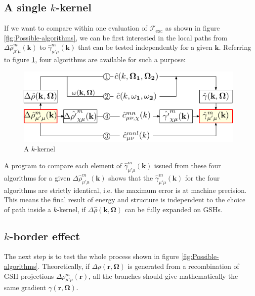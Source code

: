 \subsection{A single $k$-kernel\label{subsec:A-single-k-kernel}}

If we want to compare within one evaluation of $\mathcal{F}_{\mathrm{exc}}$
as shown in figure \ref{fig:Possible-algorithms}, we can be first
interested in the local paths from $\Delta\hat{\rho}_{\mu'\mu}^{m}(\mathbf{k})$
to $\hat{\gamma}_{\mu'\mu}^{m}(\mathbf{k})$ that can be tested independently
for a given $\mathbf{k}$. Referring to figure \ref{fig:k-kernel},
four algorithms are available for such a purpose:

\begin{figure}[h]
\begin{centering}
\includegraphics{_figure/algorithms_q}
\par\end{centering}
\caption{A $k$-kernel\label{fig:k-kernel}}
\end{figure}

A program to compare each element of $\hat{\gamma}_{\mu'\mu}^{m}(\mathbf{k})$
issued from these four algorithms for a given $\Delta\hat{\rho}_{\mu'\mu}^{m}(\mathbf{k})$
shows that the $\hat{\gamma}_{\mu'\mu}^{m}(\mathbf{k})$ for the four
algorithms are strictly identical, i.e. the maximum error is at machine
precision. This means the final result of energy and structure is
independent to the choice of path inside a $k$-kernel, if $\Delta\hat{\rho}(\mathbf{k},\mathbf{\Omega})$
can be fully expanded on \acs{GSH}s.

\subsection{$k$-border effect\label{subsec:k-border-effect}}

The next step is to test the whole process shown in figure \ref{fig:Possible-algorithms}.
Theoretically, if $\Delta\rho(\mathbf{r},\mathbf{\Omega})$ is generated
from a recombination of \acs{GSH} projections $\Delta\rho_{\mu'\mu}^{m}(\mathbf{r})$,
all the branches should give mathematically the same gradient $\gamma(\mathbf{r},\mathbf{\Omega})$. 

